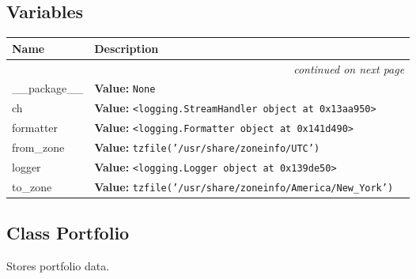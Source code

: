  \subsection{Variables}

    \vspace{-1cm}
\hspace{\varindent}\begin{longtable}{|p{\varnamewidth}|p{\vardescrwidth}|l}
\cline{1-2}
\cline{1-2} \centering \textbf{Name} & \centering \textbf{Description}& \\
\cline{1-2}
\endhead\cline{1-2}\multicolumn{3}{r}{\small\textit{continued on next page}}\\\endfoot\cline{1-2}
\endlastfoot\raggedright \_\-\_\-p\-a\-c\-k\-a\-g\-e\-\_\-\_\- & \raggedright \textbf{Value:} 
{\tt None}&\\
\cline{1-2}
\raggedright c\-h\- & \raggedright \textbf{Value:} 
{\tt {\textless}logging.StreamHandler object at 0x13aa950{\textgreater}}&\\
\cline{1-2}
\raggedright f\-o\-r\-m\-a\-t\-t\-e\-r\- & \raggedright \textbf{Value:} 
{\tt {\textless}logging.Formatter object at 0x141d490{\textgreater}}&\\
\cline{1-2}
\raggedright f\-r\-o\-m\-\_\-z\-o\-n\-e\- & \raggedright \textbf{Value:} 
{\tt tzfile('/usr/share/zoneinfo/UTC')}&\\
\cline{1-2}
\raggedright l\-o\-g\-g\-e\-r\- & \raggedright \textbf{Value:} 
{\tt {\textless}logging.Logger object at 0x139de50{\textgreater}}&\\
\cline{1-2}
\raggedright t\-o\-\_\-z\-o\-n\-e\- & \raggedright \textbf{Value:} 
{\tt tzfile('/usr/share/zoneinfo/America/New\_York')}&\\
\cline{1-2}
\end{longtable}



\subsection{Class Portfolio}

    \label{moira:Portfolio}
Stores portfolio data.



